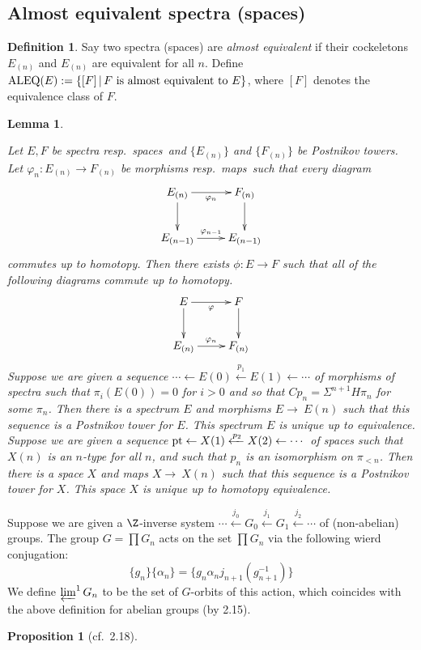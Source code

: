 \documentclass[11pt]{article}
\renewcommand{\comment}{}
\theoremstyle{plain}
\newtheorem{lem}[thm]{Lemma}
\newtheorem{prop}[thm]{Proposition}
\theoremstyle{definition}
\newtheorem{defn}[thm]{Definition}
\newcommand{\ALEQ}{\textup{ALEQ}}
\begin{document}
\subsection{Almost equivalent spectra (spaces)}
\comment{
\begin{defn}
Say two spectra (spaces) are \emph{almost equivalent} if their cockeletons
$E_{(n)}$ and $E_{(n)}$ are equivalent for all $n$. Define
$\ALEQ(E):=\{[F]\,|\,F\textup{ is almost equivalent to }E\}$, where $[F]$
denotes the equivalence class of $F$.
\end{defn}
\setcounter{thm}{2}
\begin{lem}\hfil
\begin{itemise}
\itm[(i)]Let $E,F$ be spectra \lparen resp.\ spaces\rparen\ and $\{E_{(n)}\}$
and $\{F_{(n)}\}$ be Postnikov towers. Let $\varphi_n:E_{(n)}\to F_{(n)}$ be
morphisms \lparen resp.\ maps\rparen\ such that every diagram
\[\xymatrix{
E_{(n)}\ar[r]_{\phi_n}\ar[d]&F_{(n)}\ar[d]\\
E_{(n-1)}\ar[r]^{\phi_{n-1}}&E_{(n-1)}
}\]
commutes up to homotopy. Then there exists $\phi:E\to F$ such that all of the
following diagrams commute up to homotopy.
\[\xymatrix{
E\ar[r]_\phi\ar[d]&F\ar[d]\\
E_{(n)}\ar[r]^{\phi_n}&F_{(n)}
}\]
\itm[(ii)] Suppose we are given a sequence $\cdots\leftarrow
E(0)\xleftarrow{p_1} E(1)\leftarrow\cdots$ of morphisms of spectra such that
$\pi_i(E(0))=0$ for $i>0$ and so that $Cp_n=\Sigma^{n+1}H\pi_n$ for some
$\pi_n$. Then there is a spectrum $E$ and morphisms $E\to\ E(n)$ such that this
sequence is a Postnikov tower for $E$. This spectrum $E$ is unique up to
equivalence.
\itm[(iii)]Suppose we are given a sequence $\textup{pt}\leftarrow
X(1)\xleftarrow{p_2} X(2)\leftarrow\cdots$ of spaces such that $X(n)$ is an
$n$-type for all $n$, and such that $p_n$ is an isomorphism on $\pi_{<n}$. Then
there is a space $X$ and maps $X\to\ X(n)$ such that this sequence is a
Postnikov tower for $X$. This space $X$ is unique up to homotopy equivalence.
\end{itemise}
\end{lem}
Suppose we are given a $\Z$-inverse system $\cdots
\xleftarrow{j_0}G_0\xleftarrow{j_1}G_1\xleftarrow{j_2}\cdots$ of (non-abelian)
groups. The group $G=\prod G_n$ acts on the set $\prod G_n$ via the following
wierd conjugation:
\[\{g_n\}\{\alpha_n\}=\{g_n\alpha_nj_{n+1}(g_{n+1}^{-1})\}\]
We define $\varprojlim^1G_n$ to be the set of $G$-orbits of this action, which
coincides with the above definition for abelian groups (by 2.15).
\begin{prop}[cf.\ 2.18]

\end{prop}}
\end{document}
